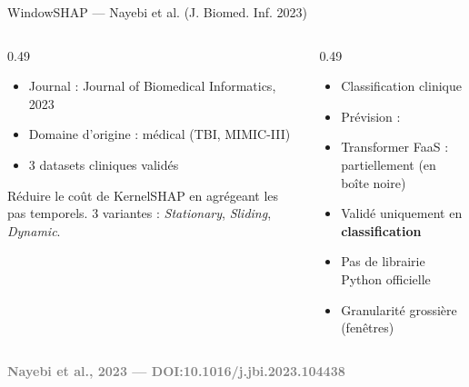\documentclass[10pt]{beamer}
\newcommand{\source}[1]{\vspace{4pt}\hfill{\textcolor{gray}{\textbf{\tiny #1}}}}
\begin{document}
\begin{frame}{WindowSHAP — Nayebi et al. (J. Biomed. Inf. 2023)}
  \begin{columns}
    \begin{column}{0.49\textwidth}
      \begin{ctxbox}
        \begin{itemize}
          \item Journal : Journal of Biomedical Informatics, 2023
          \item Domaine d'origine : médical (TBI, MIMIC-III)
          \item 3 datasets cliniques validés
        \end{itemize}
      \end{ctxbox}
      \begin{probbox}
        Réduire le coût de KernelSHAP en agrégeant les pas temporels.
        3 variantes : \emph{Stationary}, \emph{Sliding}, \emph{Dynamic}.
      \end{probbox}
    \end{column}
    \begin{column}{0.49\textwidth}
      \begin{transposbox}
        \begin{itemize}
          \item Classification clinique \checkmark
          \item Prévision : \texttimes
          \item Transformer FaaS : partiellement (en boîte noire)
        \end{itemize}
      \end{transposbox}
      \begin{limitbox}
        \begin{itemize}
          \item Validé uniquement en \textbf{classification}
          \item Pas de librairie Python officielle
          \item Granularité grossière (fenêtres)
        \end{itemize}
      \end{limitbox}
    \end{column}
  \end{columns}
  \source{Nayebi et al., 2023 --- DOI:10.1016/j.jbi.2023.104438}
\end{frame}
\end{document}
